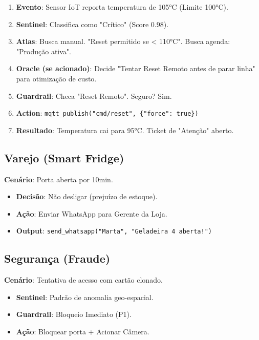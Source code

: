 \documentclass[12pt, a4paper]{article}
\begin{document}
\begin{enumerate}
    \item \textbf{Evento}: Sensor IoT reporta temperatura de 105°C (Limite 100°C).
    \item \textbf{Sentinel}: Classifica como "Crítico" (Score 0.98).
    \item \textbf{Atlas}: Busca manual. "Reset permitido se < 110°C". Busca agenda: "Produção ativa".
    \item \textbf{Oracle (se acionado)}: Decide "Tentar Reset Remoto antes de parar linha" para otimização de custo.
    \item \textbf{Guardrail}: Checa "Reset Remoto". Seguro? Sim.
    \item \textbf{Action}: \texttt{mqtt\_publish("cmd/reset", \{"force": true\})}
    \item \textbf{Resultado}: Temperatura cai para 95°C. Ticket de "Atenção" aberto.
\end{enumerate}

\subsection{Varejo (Smart Fridge)}
\textbf{Cenário}: Porta aberta por 10min.
\begin{itemize}
    \item \textbf{Decisão}: Não desligar (prejuízo de estoque).
    \item \textbf{Ação}: Enviar WhatsApp para Gerente da Loja.
    \item \textbf{Output}: \texttt{send\_whatsapp("Marta", "Geladeira 4 aberta!")}
\end{itemize}

\subsection{Segurança (Fraude)}
\textbf{Cenário}: Tentativa de acesso com cartão clonado.
\begin{itemize}
    \item \textbf{Sentinel}: Padrão de anomalia geo-espacial.
    \item \textbf{Guardrail}: Bloqueio Imediato (P1).
    \item \textbf{Ação}: Bloquear porta + Acionar Câmera.
\end{itemize}

\newpage

\end{document}
